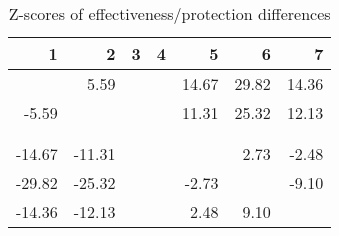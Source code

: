 \begin{table}[ht]
\centering
\begin{tabular}{rrrrrrr}
  \hline
1 & 2 & 3 & 4 & 5 & 6 & 7 \\ 
  \hline
 & 5.59 &  &  & 14.67 & 29.82 & 14.36 \\ 
  -5.59 &  &  &  & 11.31 & 25.32 & 12.13 \\ 
   &  &  &  &  &  &  \\ 
   &  &  &  &  &  &  \\ 
  -14.67 & -11.31 &  &  &  & 2.73 & -2.48 \\ 
  -29.82 & -25.32 &  &  & -2.73 &  & -9.10 \\ 
  -14.36 & -12.13 &  &  & 2.48 & 9.10 &  \\ 
   \hline
\end{tabular}
\caption{Z-scores of effectiveness/protection differences} 
\end{table}
